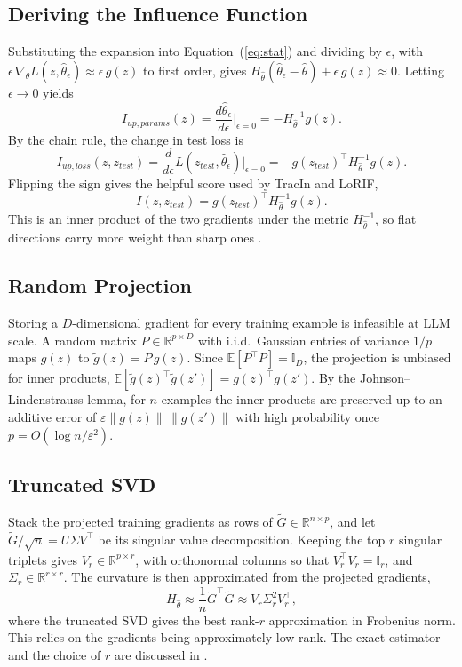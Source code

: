 \documentclass{article}
\newcommand{\hth}{\hat{\theta}}                 %
\newcommand{\Hh}{H_{\hat{\theta}}}              %
\newcommand{\gr}[1]{g(#1)}                      %
\newcommand{\gt}[1]{\tilde{g}(#1)}              %
\begin{document}
\subsection{Deriving the Influence Function}
Substituting the expansion into Equation~(\ref{eq:stat}) and dividing by $\epsilon$, with $\epsilon\,\nabla_\theta L(z,\hth_\epsilon)\approx\epsilon\,\gr{z}$ to first order, gives $\Hh(\hth_\epsilon-\hth)+\epsilon\,\gr{z}\approx0$. Letting $\epsilon\to0$ yields
\begin{equation}\label{eq:up-params}
    I_{up,params}(z)=\frac{d\hth_\epsilon}{d\epsilon}\Big|_{\epsilon=0}=-\Hh^{-1}\gr{z}.
\end{equation}
By the chain rule, the change in test loss is
\begin{equation}\label{eq:up-loss}
    I_{up,loss}(z,z_{test})=\frac{d}{d\epsilon}L(z_{test},\hth_\epsilon)\Big|_{\epsilon=0}=-\gr{z_{test}}^\top\Hh^{-1}\gr{z}.
\end{equation}
Flipping the sign gives the helpful score used by TracIn and LoRIF,
\begin{equation}\label{eq:score}
    I(z,z_{test})=\gr{z_{test}}^\top\Hh^{-1}\gr{z}.
\end{equation}
This is an inner product of the two gradients under the metric $\Hh^{-1}$, so flat directions carry more weight than sharp ones \parencite{influence-functions-2017}.

\subsection{Random Projection}
Storing a $D$-dimensional gradient for every training example is infeasible at LLM scale. A random matrix $P\in\mathbb{R}^{p\times D}$ with i.i.d.\ Gaussian entries of variance $1/p$ maps $\gr{z}$ to $\gt{z}=P\,\gr{z}$. Since $\mathbb{E}[P^\top P]=\mathbb{I}_D$, the projection is unbiased for inner products, $\mathbb{E}[\gt{z}^\top\gt{z'}]=\gr{z}^\top\gr{z'}$. By the Johnson--Lindenstrauss lemma, for $n$ examples the inner products are preserved up to an additive error of $\varepsilon\|\gr{z}\|\,\|\gr{z'}\|$ with high probability once $p=O(\log n/\varepsilon^2)$\parencite{trak}.

\subsection{Truncated SVD}
Stack the projected training gradients as rows of $\tilde G\in\mathbb{R}^{n\times p}$, and let $\tilde G/\sqrt{n}=U\Sigma V^\top$ be its singular value decomposition. Keeping the top $r$ singular triplets gives $V_r\in\mathbb{R}^{p\times r}$, with orthonormal columns so that $V_r^\top V_r=\mathbb{I}_r$, and $\Sigma_r\in\mathbb{R}^{r\times r}$. The curvature is then approximated from the projected gradients,
\begin{equation}\label{eq:lowrank-H}
    \Hh\approx\frac{1}{n}\tilde G^\top\tilde G\approx V_r\Sigma_r^2V_r^\top,
\end{equation}
where the truncated SVD gives the best rank-$r$ approximation in Frobenius norm. This relies on the gradients being approximately low rank. The exact estimator and the choice of $r$ are discussed in \textcite{loRIF}.
\end{document}
